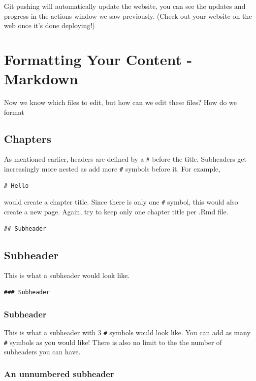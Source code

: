 \documentclass[
]{book}
\theoremstyle{definition}
\theoremstyle{definition}
\theoremstyle{definition}
\theoremstyle{definition}
\theoremstyle{remark}
\begin{document}
Git pushing will automatically update the website, you can see the updates and progress in the actions window we saw previously. (Check out your website on the web once it's done deploying!)

\chapter{Formatting Your Content - Markdown}\label{formatting-your-content---markdown}

Now we know which files to edit, but how can we edit these files? How do we format

\section{Chapters}\label{chapters}

As mentioned earlier, headers are defined by a \texttt{\#} before the title. Subheaders get increasingly more nested as add more \texttt{\#} symbols before it. For example,

\begin{verbatim}
# Hello
\end{verbatim}

would create a chapter title. Since there is only one \texttt{\#} symbol, this would also create a new page. Again, try to keep only one chapter title per .Rmd file.

\begin{verbatim}
## Subheader
\end{verbatim}

\section{Subheader}\label{subheader}

This is what a subheader would look like.

\begin{verbatim}
### Subheader
\end{verbatim}

\subsection{Subheader}\label{subheader-1}

This is what a subheader with 3 \texttt{\#} symbols would look like. You can add as many \texttt{\#} symbols as you would like! There is also no limit to the the number of subheaders you can have.

\subsection*{An unnumbered subheader}\label{an-unnumbered-subheader}
\end{document}
